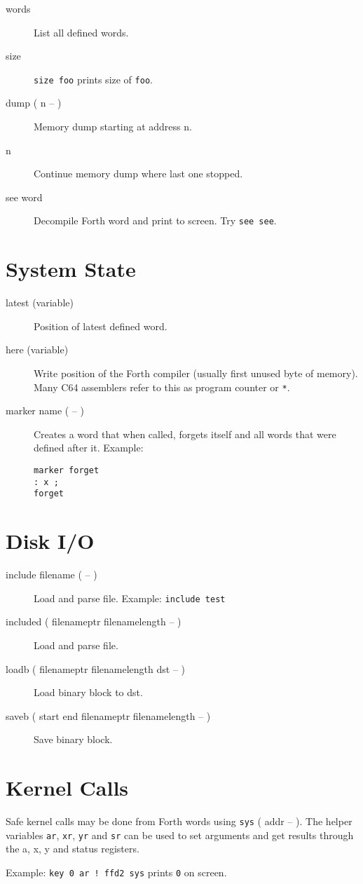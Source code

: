 \begin{description}
\item[words] List all defined words.
\item[size] \texttt{size foo} prints size of \texttt{foo}.
\item[dump ( n -- )] Memory dump starting at address n.
\item[n] Continue memory dump where last one stopped.
\item[see word] Decompile Forth word and print to screen. Try \texttt{see see}.
\end{description}

\section{System State}

\begin{description}

\item[latest (variable)] Position of latest defined word.

\item[here (variable)] Write position of the Forth compiler (usually first unused byte of memory). Many C64 assemblers refer to this as program counter or \texttt{*}.

\item[marker name ( -- )] Creates a word that when called, forgets itself and all words that were defined after it. Example:

\begin{verbatim}
marker forget
: x ;
forget
\end{verbatim}
\end{description}


\section{Disk I/O}

\begin{description}
\item[include filename ( -- )] Load and parse file. Example: \texttt{include test}
\item[included ( filenameptr filenamelength -- )] Load and parse file.
\item[loadb ( filenameptr filenamelength dst -- )] Load binary block to dst.
\item[saveb ( start end filenameptr filenamelength -- )] Save binary block.
\end{description}

\section{Kernel Calls}

Safe kernel calls may be done from Forth words using \texttt{sys} ( addr -- ). The helper variables \texttt{ar}, \texttt{xr}, \texttt{yr} and \texttt{sr} can be used to set arguments and get results through the a, x, y and status registers.

Example: \texttt{key 0 ar ! ffd2 sys} prints \texttt{0} on screen.
